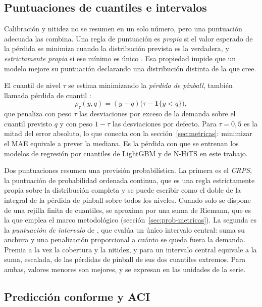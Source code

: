 \subsection{Puntuaciones de cuantiles e intervalos}\label{sec:puntuaciones}

Calibración y nitidez no se resumen en un solo número, pero una puntuación
adecuada las combina. Una regla de puntuación es \emph{propia} si el valor
esperado de la pérdida se minimiza cuando la distribución prevista es la
verdadera, y \emph{estrictamente propia} si ese mínimo es único
\parencite{gneiting2007strictly}. Esa propiedad impide que un modelo mejore su
puntuación declarando una distribución distinta de la que cree.

El cuantil de nivel $\tau$ se estima minimizando la \emph{pérdida de pinball},
también llamada pérdida de cuantil \parencite{koenker1978regression}:
\begin{equation}
	\rho_\tau(y, q) = (y - q)\bigl(\tau - \mathbf{1}\{y < q\}\bigr),
\end{equation}
que penaliza con peso $\tau$ las desviaciones por exceso de la demanda sobre el
cuantil previsto $q$ y con peso $1 - \tau$ las desviaciones por defecto. Para
$\tau = 0{,}5$ es la mitad del error absoluto, lo que conecta con la
sección~\ref{sec:metricas}: minimizar el MAE equivale a prever la mediana. Es
la pérdida con que se entrenan los modelos de regresión por cuantiles de
LightGBM y de N-HiTS en este trabajo.

Dos puntuaciones resumen una previsión probabilística. La primera es el
\emph{CRPS}, la puntuación de probabilidad ordenada continua, que es una regla
estrictamente propia sobre la distribución completa y se puede escribir como el
doble de la integral de la pérdida de pinball sobre todos los niveles. Cuando
solo se dispone de una rejilla finita de cuantiles, se aproxima por una suma
de Riemann, que es la que emplea el marco metodológico
(sección~\ref{sec:prob-metricas}). La segunda es la \emph{puntuación de
intervalo} de \textcite{gneiting2007strictly}, que evalúa un único intervalo
central: suma su anchura y una penalización proporcional a cuánto se queda
fuera la demanda. Premia a la vez la cobertura y la nitidez, y para un
intervalo central equivale a la suma, escalada, de las pérdidas de pinball de
sus dos cuantiles extremos. Para ambas, valores menores son mejores, y se
expresan en las unidades de la serie.

\subsection{Predicción conforme y ACI}\label{sec:conforme}

